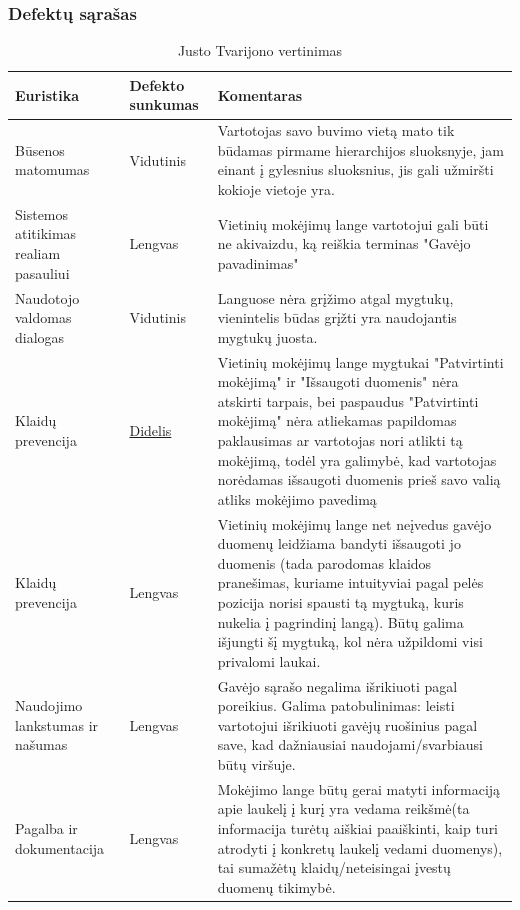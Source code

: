 \documentclass[oneside]{VUMIFPSkursinis}
\begin{document}
\subsubsection{Defektų sąrašas}
\begin{center}
\begin{longtable}[!htb]{|p{3.5cm}|p{3.5cm}|p{8.1cm}|}
	\caption{Justo Tvarijono vertinimas}
	\endfirsthead
	\endhead
  \hline
	Euristika & Defekto sunkumas & Komentaras \\ \hline
	Būsenos matomumas & Vidutinis & Vartotojas savo buvimo vietą mato tik būdamas pirmame hierarchijos sluoksnyje, jam einant į gylesnius sluoksnius, jis gali užmiršti kokioje vietoje yra. \\ \hline
	Sistemos atitikimas realiam pasauliui & Lengvas & Vietinių mokėjimų lange vartotojui gali būti ne akivaizdu, ką reiškia terminas "Gavėjo pavadinimas" \\ \hline
	Naudotojo valdomas dialogas & Vidutinis & Languose nėra grįžimo atgal mygtukų, vienintelis būdas grįžti yra naudojantis mygtukų juosta. \\ \hline
	Klaidų prevencija \label{lentele:klaiduPrevencijaJ} &\hyperref[fig:klaiduPrevencijaMygtukai]{Didelis} & Vietinių mokėjimų lange mygtukai "Patvirtinti mokėjimą" ir "Išsaugoti duomenis" nėra atskirti tarpais, bei paspaudus "Patvirtinti mokėjimą" nėra atliekamas papildomas paklausimas ar vartotojas nori atlikti tą mokėjimą, todėl yra galimybė, kad vartotojas norėdamas išsaugoti duomenis prieš savo valią atliks mokėjimo pavedimą\\ \hline
	Klaidų prevencija & Lengvas & Vietinių mokėjimų lange net neįvedus gavėjo duomenų leidžiama bandyti išsaugoti jo duomenis (tada parodomas klaidos pranešimas, kuriame intuityviai pagal pelės pozicija norisi spausti tą mygtuką, kuris nukelia į pagrindinį langą). Būtų galima išjungti šį mygtuką, kol nėra užpildomi visi privalomi laukai. \\ \hline
	Naudojimo lankstumas ir našumas & Lengvas & Gavėjo sąrašo negalima išrikiuoti pagal poreikius. Galima patobulinimas: leisti vartotojui išrikiuoti gavėjų ruošinius pagal save, kad dažniausiai naudojami/svarbiausi būtų viršuje. \\ \hline
	Pagalba ir dokumentacija & Lengvas & Mokėjimo lange būtų gerai matyti informaciją apie laukelį į kurį yra vedama reikšmė(ta informacija turėtų aiškiai paaiškinti, kaip turi atrodyti į konkretų laukelį vedami duomenys), tai sumažėtų klaidų/neteisingai įvestų duomenų tikimybė.  \\ \hline
\end{longtable}
\end{center}
\end{document}
